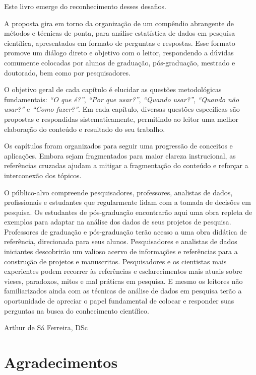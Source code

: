 \documentclass[
]{book}
\begin{document}
Este livro emerge do reconhecimento desses desafios.

A proposta gira em torno da organização de um compêndio abrangente de métodos e técnicas de ponta, para análise estatística de dados em pesquisa científica, apresentados em formato de perguntas e respostas. Esse formato promove um diálogo direto e objetivo com o leitor, respondendo a dúvidas comumente colocadas por alunos de graduação, pós-graduação, mestrado e doutorado, bem como por pesquisadores.

O objetivo geral de cada capítulo é elucidar as questões metodológicas fundamentais: \emph{``O que é?''}, \emph{``Por que usar?''}, \emph{``Quando usar?''}, \emph{``Quando não usar?''} e \emph{``Como fazer?''}. Em cada capítulo, diversas questões específicas são propostas e respondidas sistematicamente, permitindo ao leitor uma melhor elaboração do conteúdo e resultado do seu trabalho.

Os capítulos foram organizados para seguir uma progressão de conceitos e aplicações. Embora sejam fragmentados para maior clareza instrucional, as referências cruzadas ajudam a mitigar a fragmentação do conteúdo e reforçar a interconexão dos tópicos.

O público-alvo compreende pesquisadores, professores, analistas de dados, profissionais e estudantes que regularmente lidam com a tomada de decisões em pesquisa. Os estudantes de pós-graduação encontrarão aqui uma obra repleta de exemplos para adaptar na análise dos dados de seus projetos de pesquisa. Professores de graduação e pós-graduação terão acesso a uma obra didática de referência, direcionada para seus alunos. Pesquisadores e analistas de dados iniciantes descobrirão um valioso acervo de informações e referências para a construção de projetos e manuscritos. Pesquisadores e os cientistas mais experientes podem recorrer às referências e esclarecimentos mais atuais sobre vieses, paradoxos, mitos e mal práticas em pesquisa. E mesmo os leitores não familiarizados ainda com as técnicas de análise de dados em pesquisa terão a oportunidade de apreciar o papel fundamental de colocar e responder suas perguntas na busca do conhecimento científico.

Arthur de Sá Ferreira, DSc

\hypertarget{agradecimentos}{%
\chapter*{Agradecimentos}\label{agradecimentos}}
\end{document}
